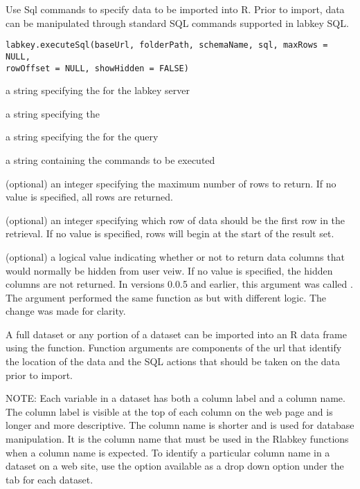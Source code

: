 \begin{Description}\relax
Use Sql commands to specify data to be imported into R. Prior to import, data can
be manipulated through standard SQL commands supported in labkey SQL.
\end{Description}
\begin{Usage}
\begin{verbatim}
labkey.executeSql(baseUrl, folderPath, schemaName, sql, maxRows = NULL, 
rowOffset = NULL, showHidden = FALSE)
\end{verbatim}
\end{Usage}
\begin{Arguments}
\begin{ldescription}
\item[\code{baseUrl}] a string specifying the for the labkey server
\item[\code{folderPath}] a string specifying the  
\item[\code{schemaName}] a string specifying the   for the query
\item[\code{sql}] a string containing the  commands to be executed
\item[\code{maxRows}] (optional) an integer specifying the maximum number of rows to return. If no value is specified, all rows are returned.
\item[\code{rowOffset}] (optional) an integer specifying which row of data should be the first row in the retrieval. 
If no value is specified, rows will begin at the start of the result set.
\item[\code{showHidden}] (optional) a logical value indicating whether or not to return data columns that would 
normally be hidden from user veiw. If no value is specified, the hidden columns are not returned. 
In versions 0.0.5 and earlier, this argument was called . The  argument performed the same function as  but with different logic. The change was made for clarity.
\end{ldescription}
\end{Arguments}
\begin{Details}\relax
A full dataset or any portion of a dataset can be imported into an R
data frame using the 
function. Function arguments are components of the url that identify the location of the
data and the SQL actions that should be taken on the data prior to import.


NOTE: Each variable in a dataset has both a column label and a column name. The column label is visible at the top
of each column on the web page and is longer and more descriptive. The column name is shorter and is
used  for database manipulation. It is the column name that must be used in
the Rlabkey functions when a column name is expected. To identify a particular column name in a dataset on
a web site, use the  option available as a drop down option under the 
tab for each dataset.
\end{Details}
